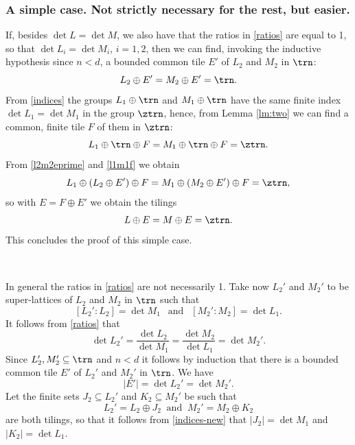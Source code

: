 \documentclass[12pt,a4paper,oneside]{amsart}
\theoremstyle{plain}
\theoremstyle{definition}
\newcommand{\Abs}[1]{{\left|{#1}\right|}}
\begin{document}
\subsubsection{A simple case. Not strictly necessary for the rest, but easier.}


If, besides $\det L = \det M$, we also have that the ratios in \eqref{ratios} are equal to 1, so that $\det L_i = \det M_i$, $i=1,2$, then we can find{, invoking the inductive hypothesis since $n<d$,} a bounded common tile $E'$ of $L_2$ and $M_2$ in $\trn$:
\begin{equation}\label{l2m2eprime}
L_2 \oplus E' = M_2 \oplus E' = \trn.
\end{equation}
From \eqref{indices} the groups $L_1 \oplus \trn$ and $M_1 \oplus \trn$ have the same finite index $\det L_1 = \det M_1$ in the group $\ztrn$, hence, from Lemma \ref{lm:two} we can find a common, finite tile $F$ of them in $\ztrn$:
\begin{equation}\label{l1m1f}
L_1\oplus\trn \oplus F = M_1 \oplus \trn \oplus F = \ztrn.
\end{equation}
From \eqref{l2m2eprime} and \eqref{l1m1f} we obtain
$$
L_1\oplus (L_2 \oplus E') \oplus F =
M_1\oplus (M_2 \oplus E') \oplus F = \ztrn,
$$
so with $E = F \oplus E'$ we obtain the tilings
$$
L \oplus E = M \oplus E = \ztrn.
$$
This concludes the proof of this simple case.

\ 

In general the ratios in \eqref{ratios} are not necessarily 1.
Take now $L_2'$ and $M_2'$ to be super-lattices of $L_2$ and $M_2$ in $\trn$ such that
\begin{equation}\label{indices-new}
[L_2' : L_2] = \det M_1\ \ \text{ and } \ \ [M_2' : M_2] = \det L_1.
\end{equation}
It follows from \eqref{ratios} that
\begin{equation}\label{ratios1}
\det L_2' = \frac{\det L_2}{\det M_1} =
 \frac{\det M_2}{\det L_1} = \det M_2'.
\end{equation}
{Since $L_2', M_2' \subseteq \trn$ and $n<d$ it follows by induction} that there is a bounded common tile $E'$ of $L_2'$ and $M_2'$ in $\trn$. We have
$$
\Abs{E'} = \det L_2'  = \det M_2 '.
$$
Let the finite sets $J_2\subseteq L_2'$ and $K_2\subseteq M_2'$ be such that
$$
L_2' = L_2 \oplus J_2 \ \text{ and }\ M_2' = M_2 \oplus K_2
$$
are both tilings, so that it follows from \eqref{indices-new} that $\Abs{J_2} = \det M_1$ and $\Abs{K_2} = \det L_1$.
\end{document}
